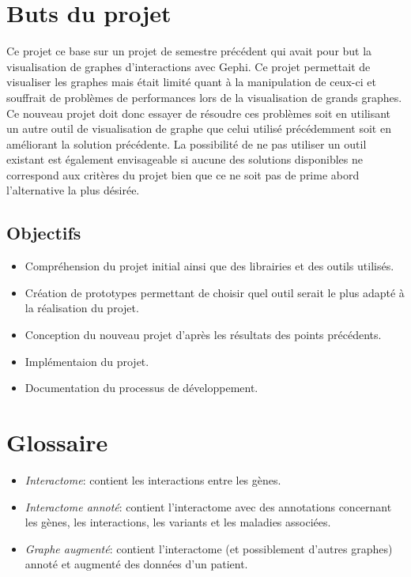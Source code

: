 \documentclass{article}
\begin{document}
\section{Buts du projet}
  Ce projet ce base sur un projet de semestre précédent qui avait pour but la visualisation de graphes d'interactions avec Gephi. Ce projet permettait de visualiser les graphes mais était limité quant à la manipulation de ceux-ci et souffrait de problèmes de performances lors de la visualisation de grands graphes.\\
  Ce nouveau projet doit donc essayer de résoudre ces problèmes soit en utilisant un autre outil de visualisation de graphe que celui utilisé précédemment soit en améliorant la solution précédente. La possibilité de ne pas utiliser un outil existant est également envisageable si aucune des solutions disponibles ne correspond aux critères du projet bien que ce ne soit pas de prime abord l'alternative la plus désirée.
  \subsection{Objectifs}
  \begin{itemize}
    \item Compréhension du projet initial ainsi que des librairies et des outils utilisés.
    \item Création de prototypes permettant de choisir quel outil serait le plus adapté à la réalisation du projet.
    \item Conception du nouveau projet d'après les résultats des points précédents.
    \item Implémentaion du projet.
    \item Documentation du processus de développement.
  \end{itemize}

\section{Glossaire}
  \begin{itemize}
    \item \textit{Interactome}: contient les interactions entre les gènes.
    \item \textit{Interactome annoté}: contient l'interactome avec des annotations concernant les gènes, les interactions, les variants et les maladies associées.
    \item \textit{Graphe augmenté}: contient l'interactome (et possiblement d'autres graphes) annoté et augmenté des données d'un patient.
  \end{itemize}
\cite{Sisto:2014}
\end{document}
